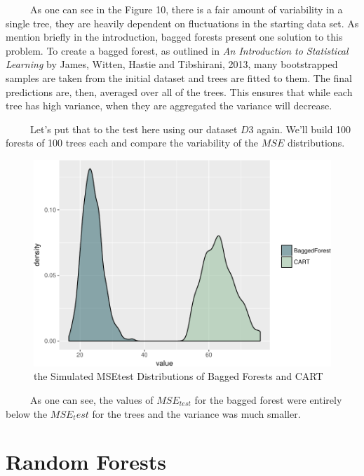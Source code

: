 \documentclass[12pt,twoside]{reedthesis}
\begin{document}
  ~~~~~As one can see in the Figure 10, there is a fair amount of
  variability in a single tree, they are heavily dependent on fluctuations
  in the starting data set. As mention briefly in the introduction, bagged
  forests present one solution to this problem. To create a bagged forest,
  as outlined in \emph{An Introduction to Statistical Learning} by James,
  Witten, Hastie and Tibshirani, 2013, many bootstrapped samples are taken
  from the initial dataset and trees are fitted to them. The final
  predictions are, then, averaged over all of the trees. This ensures that
  while each tree has high variance, when they are aggregated the variance
  will decrease.
  
  ~~~~~Let's put that to the test here using our dataset \(D3\) again.
  We'll build 100 forests of 100 trees each and compare the variability of
  the \(MSE\) distributions.
  
  \begin{figure}[htbp]
  \centering
  \includegraphics{Thesis_files/figure-latex/baggedvcart-1.pdf}
  \caption{\label{fig:baggedvcart}the Simulated MSEtest Distributions of
  Bagged Forests and CART}
  \end{figure}
  
  ~~~~~As one can see, the values of \(MSE_{test}\) for the bagged forest
  were entirely below the \(MSE_test\) for the trees and the variance was
  much smaller.
  
  \section{Random Forests}\label{random-forests}
  
\end{document}
